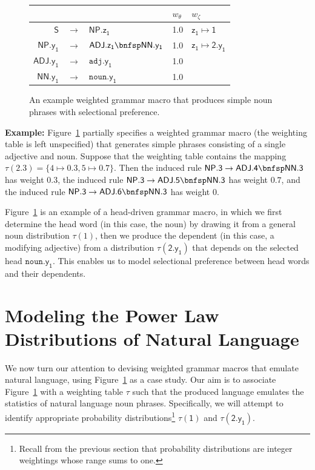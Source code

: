 \documentclass[11pt,a4paper]{article}
\renewcommand{\bnfpn}[1]{\mathsf{#1}}
\renewcommand{\bnfpo}{\rightarrow}
\renewcommand{\bnfts}[1]{\mathtt{#1}}
\begin{document}
\begin{figure}
\begin{tabular}{rcl|l|l} 
&&&$w_\theta$&$w_\zeta$\\
\hline \hline
$\bnfpn{S}$ &$\bnfpo$& $\bnfpn{NP.z_1}$ & 1.0 & $\bnfpn{z_1} \mapsto \bnfpn{1}$ \\
$\bnfpn{NP.y_1}$ &$\bnfpo$& $\bnfpn{ADJ.z_1} \bnfsp \bnfpn{NN.y_1}$ & 1.0 & $\bnfpn{z_1} \mapsto \bnfpn{2.y_1}$\\
$\bnfpn{ADJ.y_1}$ &$\bnfpo$& $\bnfts{adj}.\bnfpn{y_1}$ & 1.0 &\\
$\bnfpn{NN.y_1}$ &$\bnfpo$& $\bnfts{noun}.\bnfpn{y_1}$ & 1.0 &
\end{tabular}
\caption{An example weighted grammar macro that produces simple noun phrases with selectional preference.\label{fig:gmacro2}}
\end{figure}


\textbf{Example: } Figure~\ref{fig:gmacro2} partially specifies a weighted grammar macro (the weighting table is left unspecified) that generates simple phrases consisting of a single adjective and noun. Suppose that the weighting table contains the mapping $\tau(\bnfpn{2.3}) = \{4 \mapsto 0.3, 5 \mapsto 0.7\}$. Then the induced rule $\bnfpn{NP.3} \bnfpo \bnfpn{ADJ.4} \bnfsp \bnfpn{NN.3}$ has weight $0.3$, the induced rule $\bnfpn{NP.3} \bnfpo \bnfpn{ADJ.5} \bnfsp \bnfpn{NN.3}$ has weight $0.7$, and the induced rule $\bnfpn{NP.3} \bnfpo \bnfpn{ADJ.6} \bnfsp \bnfpn{NN.3}$ has weight 0.

Figure~\ref{fig:gmacro2} is an example of a head-driven grammar macro, in which we first determine the head word (in this case, the noun) by drawing it from a general noun distribution $\tau(1)$, then we produce the dependent (in this case, a modifying adjective) from a distribution $\tau(\bnfpn{2.y_1})$ that depends on the selected head $\bnfts{noun}.\bnfpn{y_1}$. This enables us to model selectional preference between head words and their dependents.


\section{Modeling the Power Law Distributions of Natural Language\label{sec:powerlaw}}


We now turn our attention to devising weighted grammar macros that emulate natural language, using Figure~\ref{fig:gmacro2} as a case study. Our aim is to associate Figure~\ref{fig:gmacro2} with a weighting table $\tau$ such that the produced language emulates the statistics of natural language noun phrases. Specifically, we will attempt to identify appropriate probability distributions\footnote{Recall from the previous section that probability distributions are integer weightings whose range sums to one.} $\tau(\bnfpn{1})$ and $\tau(\bnfpn{2.y_1})$. 
\end{document}
